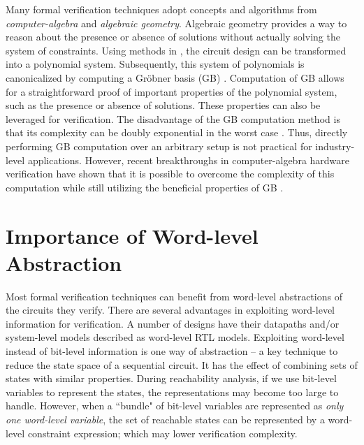 Many formal verification techniques adopt concepts and algorithms from 
\emph{computer-algebra} and \emph{algebraic geometry}.
Algebraic geometry provides a way to reason about the presence or absence of solutions 
without actually solving the system of constraints.
Using methods in \cite{Avrunin:CAV,condrat-tacas07,gbverify:2007,jinpeng,pruss:tcad15}, 
the circuit design can be transformed into a polynomial system. Subsequently, this system
of polynomials is canonicalized by computing a Gr\"obner basis (GB) \cite{gb_book}. 
Computation of GB allows for 
a straightforward proof of important properties of the polynomial system, 
such as the presence or absence of 
solutions. These properties can also be leveraged for 
verification. The disadvantage of the GB computation method is that its complexity can be doubly 
exponential in the worst case \cite{dube1986complexity}. Thus, directly performing GB computation 
over an arbitrary setup is not practical for industry-level applications. However, recent
breakthroughs in computer-algebra hardware verification have shown
that it is possible to overcome the complexity of this computation while
still utilizing the beneficial properties of GB
\cite{lv:phd,tim:phd}.

\section{Importance of Word-level Abstraction}
Most formal verification techniques can benefit from word-level abstractions 
of the circuits they verify.
There are several advantages in exploiting word-level information for
verification. A number of designs have  their
datapaths and/or system-level models described as word-level RTL
models.  Exploiting word-level instead of bit-level information is one
way of abstraction -- a key technique to reduce the state space of a
sequential circuit. It has the effect of combining sets of states with similar 
properties. During reachability analysis, if we use bit-level
variables to  represent the states, the representations may become too
large to handle. However, when a ``bundle" of bit-level variables are
represented as {\it only one word-level variable}, the set of
reachable states can be represented by a  word-level constraint
expression; which may lower verification complexity.



